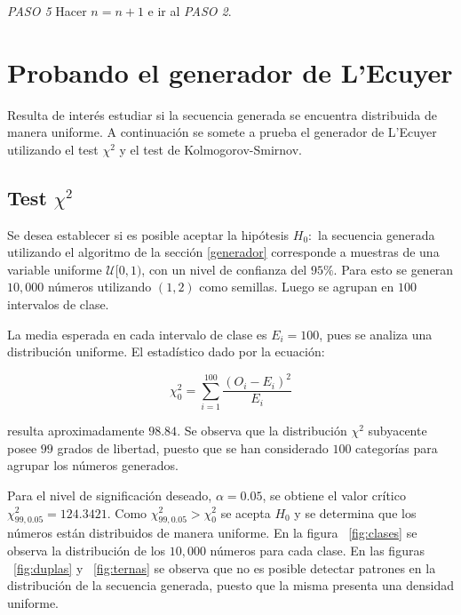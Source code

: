 \documentclass{sig-alternate}
\begin{document}
\textit{PASO 5}
Hacer $n = n + 1$ e ir al \textit{PASO 2}.

\section{Probando el generador de L'Ecuyer}\label{pruebagenerador}

Resulta de inter\'{e}s estudiar si la secuencia generada se encuentra
distribuida de manera uniforme. A continuaci\'{o}n se somete a prueba el
generador de L'Ecuyer utilizando el test $\chi^{2}$ y el test de 
Kolmogorov-Smirnov.

\subsection{Test $\chi^{2}$}\label{testchicuadrado}

Se desea establecer si es posible aceptar la hip\'{o}tesis $H_{0}:$ la secuencia
generada utilizando el algoritmo de la secci\'{o}n \ref{generador} corresponde 
a muestras de una variable uniforme $\mathcal{U}[0,1)$,
con un nivel de confianza del $95\%$. Para esto se generan $10,000$ n\'{u}meros 
utilizando $(1,2)$ como semillas. Luego se agrupan en $100$ intervalos de clase.

La media esperada en cada intervalo de clase es $E_{i} = 100$, pues se analiza 
una distribuci\'{o}n uniforme. El estad\'{i}stico dado por la ecuaci\'{o}n:

\begin{equation}\label{estadistico}
\chi^{2}_{0} = \sum_{i=1}^{100} \frac{(O_{i} - E_{i})^{2}}{E_{i}}
\end{equation}

resulta aproximadamente $98.84$.
Se observa que la distribuci\'{o}n $\chi^{2}$ subyacente posee $99$ grados de
libertad, puesto que se han considerado $100$ categor\'{i}as para agrupar los
n\'{u}meros generados.

Para el nivel de significaci\'{o}n deseado, $\alpha = 0.05$, se obtiene el
valor cr\'{i}tico $\chi^{2}_{99,0.05} = 124.3421$. Como 
$\chi^{2}_{99,0.05} > \chi^{2}_{0}$ se acepta $H_{0}$ y se determina que
los n\'{u}meros est\'{a}n distribuidos de manera uniforme. En la figura
~\ref{fig:clases} se observa la distribuci\'{o}n de los $10,000$ n\'{u}meros para
cada clase. En las figuras ~\ref{fig:duplas} y ~\ref{fig:ternas} se observa que no es
posible detectar patrones en la distribuci\'{o}n de la secuencia generada, puesto
que la misma presenta una densidad uniforme.
\end{document}
